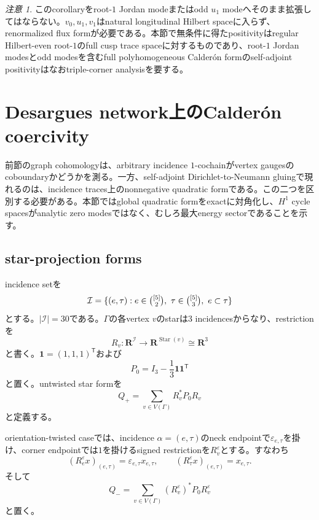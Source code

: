 \documentclass[11pt,a4paper]{ltjsarticle}
\theoremstyle{definition}
\theoremstyle{remark}
\newtheorem{remark}[theorem]{注意}
\newcommand{\RR}{\mathbf R}
\newcommand{\one}{\mathbf 1}
\newcommand{\Star}{\operatorname{Star}}
\begin{document}
\begin{remark}
このcorollaryをroot-$1$ Jordan modeまたはodd $u_1$ modeへそのまま拡張してはならない。$v_0,u_1,v_1$はnatural longitudinal Hilbert spaceに入らず、renormalized flux formが必要である。本節で無条件に得たpositivityはregular Hilbert-even root-$1$のfull cusp trace spaceに対するものであり、root-$1$ Jordan modesとodd modesを含むfull polyhomogeneous Calder\'on formのself-adjoint positivityはなおtriple-corner analysisを要する。
\end{remark}


\section{Desargues network上のCalder\'on coercivity}
\label{sec:calderon-network}

前節のgraph cohomologyは、arbitrary incidence $1$-cochainがvertex gaugesのcoboundaryかどうかを測る。一方、self-adjoint Dirichlet-to-Neumann gluingで現れるのは、incidence traces上のnonnegative quadratic formである。この二つを区別する必要がある。本節ではglobal quadratic formをexactに対角化し、$H^1$ cycle spacesがanalytic zero modesではなく、むしろ最大energy sectorであることを示す。

\subsection{star-projection forms}

incidence setを
\[
 \mathcal I=
 \{(e,\tau):e\in\tbinom{[5]}2,
 \ \tau\in\tbinom{[5]}3,\ e\subset\tau\}
\]
とする。$|\mathcal I|=30$である。$\Gamma$の各vertex $v$のstarは3 incidencesからなり、restrictionを
\[
 R_v:\RR^{\mathcal I}\longrightarrow\RR^{\Star(v)}\cong\RR^3
\]
と書く。$\one=(1,1,1)^{\mathsf T}$および
\begin{equation}\label{eq:star-projector}
 P_0=I_3-\frac13\one\one^{\mathsf T}
\end{equation}
と置く。untwisted star formを
\begin{equation}\label{eq:Qplus-definition}
 Q_+=\sum_{v\in V(\Gamma)}R_v^*P_0R_v
\end{equation}
と定義する。

orientation-twisted caseでは、incidence $\alpha=(e,\tau)$のneck endpointで$\varepsilon_{e,\tau}$を掛け、corner endpointでは$1$を掛けるsigned restrictionを$R_v^\varepsilon$とする。すなわち
\[
 (R_e^\varepsilon x)_{(e,\tau)}
 =\varepsilon_{e,\tau}x_{e,\tau},
 \qquad
 (R_\tau^\varepsilon x)_{(e,\tau)}=x_{e,\tau}.
\]
そして
\begin{equation}\label{eq:Qminus-definition}
 Q_-=\sum_{v\in V(\Gamma)}
 (R_v^\varepsilon)^*P_0R_v^\varepsilon
\end{equation}
と置く。
\end{document}
